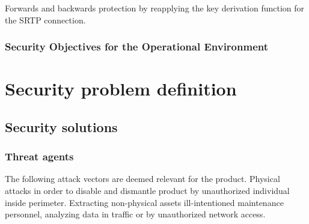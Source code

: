 \documentclass[10pt]{article}
\begin{document}

        Forwards and backwards protection by reapplying the key derivation
        function for the SRTP connection.

  \subsubsection{Security Objectives for the Operational Environment}
	\begin{itemize}
	\end{itemize}

  \section{Security problem definition}

    \subsection{Security solutions}



 \subsubsection{Threat agents}

      The following attack vectors are deemed relevant for the product.
      Physical attacks in order to disable and dismantle product by
      unauthorized individual inside perimeter. Extracting non-physical
      assets ill-intentioned maintenance personnel, analyzing data in
      traffic or by unauthorized network access.
\end{document}
